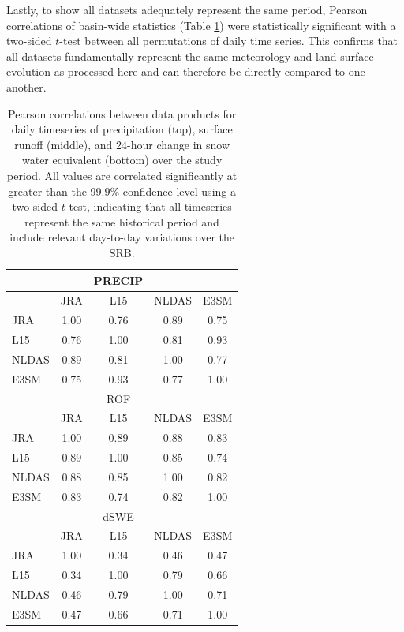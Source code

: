 \documentclass[nhess, manuscript]{copernicus}
\begin{document}
Lastly, to show all datasets adequately represent the same period, Pearson correlations of basin-wide statistics (Table \ref{table:correlations}) were statistically significant with a two-sided $t$-test between all permutations of daily time series.
This confirms that all datasets fundamentally represent the same meteorology and land surface evolution as processed here and can therefore be directly compared to one another.

\begin{table}[]
\caption{Pearson correlations between data products for daily timeseries of precipitation (top), surface runoff (middle), and 24-hour change in snow water equivalent (bottom) over the study period. All values are correlated significantly at greater than the 99.9\% confidence level using a two-sided $t$-test, indicating that all timeseries represent the same historical period and include relevant day-to-day variations over the SRB.}
\begin{tabular}{lcccc}
 \hline
      &      & PRECIP &       &       \\ \hline
      & JRA  & L15    & NLDAS & E3SM \\
JRA   & 1.00 & 0.76   & 0.89  & 0.75 \\
L15   & 0.76 & 1.00   & 0.81  & 0.93 \\
NLDAS & 0.89 & 0.81   & 1.00  & 0.77 \\
E3SM  & 0.75 & 0.93   & 0.77  & 1.00  \\ \hline \hline
      &      & ROF    &       &      \\ \hline
      & JRA  & L15    & NLDAS & E3SM \\
JRA   & 1.00 & 0.89   & 0.88  & 0.83 \\
L15   & 0.89 & 1.00   & 0.85  & 0.74 \\
NLDAS & 0.88 & 0.85   & 1.00  & 0.82 \\
E3SM  & 0.83 & 0.74   & 0.82  & 1.00 \\ \hline \hline
      &      & dSWE   &       &      \\ \hline
      & JRA  & L15    & NLDAS & E3SM \\
JRA   & 1.00 & 0.34   & 0.46  & 0.47 \\
L15   & 0.34 & 1.00   & 0.79  & 0.66 \\
NLDAS & 0.46 & 0.79   & 1.00  & 0.71 \\
E3SM  & 0.47 & 0.66   & 0.71  & 1.00 \\ \hline \hline
\end{tabular}
\label{table:correlations}
\end{table}
\end{document}
